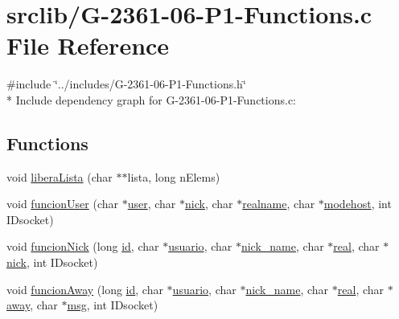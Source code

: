 \hypertarget{_g-2361-06-_p1-_functions_8c}{}\section{srclib/\+G-\/2361-\/06-\/\+P1-\/\+Functions.c File Reference}
\label{_g-2361-06-_p1-_functions_8c}
{\ttfamily \#include \char`\"{}../includes/\+G-\/2361-\/06-\/\+P1-\/\+Functions.\+h\char`\"{}}\\*
Include dependency graph for G-\/2361-\/06-\/\+P1-\/\+Functions.c\+:
\subsection*{Functions}
\begin{DoxyCompactItemize}
\item 
void \hyperlink{_g-2361-06-_p1-_functions_8c_a5fa63429b3483f20a469c23625c96820}{libera\+Lista} (char $\ast$$\ast$lista, long n\+Elems)
\item 
void \hyperlink{_g-2361-06-_p1-_functions_8c_a210d0586ca040ccaa2104d06e224c108}{funcion\+User} (char $\ast$\hyperlink{_g-2361-06-_p1-_server_8c_a14871705f45ccdc5bb9f4549efd8e119}{user}, char $\ast$\hyperlink{_g-2361-06-_p1-_server_8c_a89f27568c92a418413e6b37b41f07e21}{nick}, char $\ast$\hyperlink{_g-2361-06-_p1-_server_8c_a980ab011cd3d327b370c042833f1dc08}{realname}, char $\ast$\hyperlink{_g-2361-06-_p1-_server_8c_a4f28f55d19ac069eabc38c224c3a4225}{modehost}, int I\+Dsocket)
\item 
void \hyperlink{_g-2361-06-_p1-_functions_8c_ad060b5b909c563dc4d6d1737c9bfaaa9}{funcion\+Nick} (long \hyperlink{_g-2361-06-_p1-_server_8c_a7350fbd6ad10618f3b750b1f99ca5c3c}{id}, char $\ast$\hyperlink{_g-2361-06-_p1-_server_8c_a0147a5b81499984f9cb00379a8cb84af}{usuario}, char $\ast$\hyperlink{_g-2361-06-_p1-_server_8c_aabbf66718cda228b924a4a9441eadf62}{nick\+\_\+name}, char $\ast$\hyperlink{_g-2361-06-_p1-_server_8c_af832f551e1c343666c3d2a55834139a0}{real}, char $\ast$\hyperlink{_g-2361-06-_p1-_server_8c_a89f27568c92a418413e6b37b41f07e21}{nick}, int I\+Dsocket)
\item 
void \hyperlink{_g-2361-06-_p1-_functions_8c_a92e862feef3db4374ed9b1b941edfae3}{funcion\+Away} (long \hyperlink{_g-2361-06-_p1-_server_8c_a7350fbd6ad10618f3b750b1f99ca5c3c}{id}, char $\ast$\hyperlink{_g-2361-06-_p1-_server_8c_a0147a5b81499984f9cb00379a8cb84af}{usuario}, char $\ast$\hyperlink{_g-2361-06-_p1-_server_8c_aabbf66718cda228b924a4a9441eadf62}{nick\+\_\+name}, char $\ast$\hyperlink{_g-2361-06-_p1-_server_8c_af832f551e1c343666c3d2a55834139a0}{real}, char $\ast$\hyperlink{_g-2361-06-_p1-_server_8c_adf86742e21384f58f8999d8317e6a370}{away}, char $\ast$\hyperlink{_g-2361-06-_p1-_server_8c_a32d2f5216cddb59c7cc8fb2806a7e727}{msg}, int I\+Dsocket)
$$
\end{DoxyCompactItemize}
